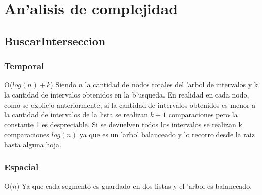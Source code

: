 \section{An'alisis de complejidad}
\subsection{BuscarInterseccion}
\subsubsection{Temporal}
O($log(n)+k$)
Siendo $n$ la cantidad de nodos totales del 'arbol de intervalos y k la cantidad de intervalos obtenidos en la b'usqueda. 
En realidad en cada nodo, como se explic'o anteriormente, si la cantidad de intervalos obtenidos es menor a la cantidad de intervalos de la lista se realizan $k+1$ comparaciones pero la constante 1 es despreciable. Si se devuelven todos los intervalos se realizan k comparaciones
$log(n)$ ya que es un 'arbol balanceado y lo recorro desde la raiz hasta alguna hoja.

\subsubsection{Espacial}
O($n$) 
Ya que cada segmento es guardado en dos listas y el 'arbol es balanceado.
